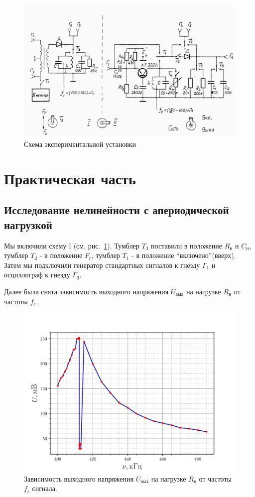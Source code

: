 

\begin{figure}[H]
	\centering
	\includegraphics[width=.9\textwidth]{picture/pic10.jpg}
	\caption{Схема экспериментальной установки}
	\label{pic:10}
\end{figure}

\newpage

\section{Практическая часть}
\subsection{Исследование нелинейности с апериодической нагрузкой}
Мы включили схему I (см. рис.~\ref{pic:10}). Тумблер $T_3$ поставили в положение $R_{\text{н}}$ н $C_{\text{н}}$,
тумблер $T_2$ - в положение $F_{\text{г}}$, тумблер $T_1$ - в положение “включено”(вверх). Затем мы
подключили генератор стандартных сигналов к гнезду $\Gamma_1$ и осциллограф к гнезду $\Gamma_3$.

Далее была снята зависимость выходного напряжения $U_{\text{вых}}$ на нагрузке $R_{\text{н}}$ от частоты $f_c$. 
\begin{figure}[H]
	\centering
	\includegraphics[width=\textwidth]{fig/exp1.pdf}
	\caption{Зависимость выходного напряжения $U_{\text{вых}}$ на нагрузке $R_{\text{н}}$ от частоты $f_c$ сигнала.}
	\label{exp:1}
\end{figure}


